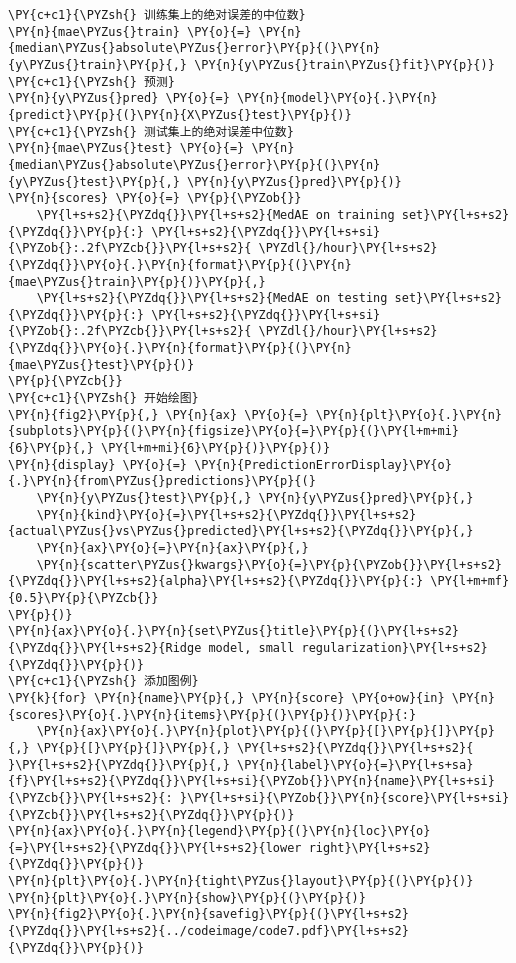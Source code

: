 \begin{Verbatim}[commandchars=\\\{\}]
\PY{c+c1}{\PYZsh{} 训练集上的绝对误差的中位数}
\PY{n}{mae\PYZus{}train} \PY{o}{=} \PY{n}{median\PYZus{}absolute\PYZus{}error}\PY{p}{(}\PY{n}{y\PYZus{}train}\PY{p}{,} \PY{n}{y\PYZus{}train\PYZus{}fit}\PY{p}{)}
\PY{c+c1}{\PYZsh{} 预测}
\PY{n}{y\PYZus{}pred} \PY{o}{=} \PY{n}{model}\PY{o}{.}\PY{n}{predict}\PY{p}{(}\PY{n}{X\PYZus{}test}\PY{p}{)}
\PY{c+c1}{\PYZsh{} 测试集上的绝对误差中位数}
\PY{n}{mae\PYZus{}test} \PY{o}{=} \PY{n}{median\PYZus{}absolute\PYZus{}error}\PY{p}{(}\PY{n}{y\PYZus{}test}\PY{p}{,} \PY{n}{y\PYZus{}pred}\PY{p}{)}
\PY{n}{scores} \PY{o}{=} \PY{p}{\PYZob{}}
    \PY{l+s+s2}{\PYZdq{}}\PY{l+s+s2}{MedAE on training set}\PY{l+s+s2}{\PYZdq{}}\PY{p}{:} \PY{l+s+s2}{\PYZdq{}}\PY{l+s+si}{\PYZob{}:.2f\PYZcb{}}\PY{l+s+s2}{ \PYZdl{}/hour}\PY{l+s+s2}{\PYZdq{}}\PY{o}{.}\PY{n}{format}\PY{p}{(}\PY{n}{mae\PYZus{}train}\PY{p}{)}\PY{p}{,}
    \PY{l+s+s2}{\PYZdq{}}\PY{l+s+s2}{MedAE on testing set}\PY{l+s+s2}{\PYZdq{}}\PY{p}{:} \PY{l+s+s2}{\PYZdq{}}\PY{l+s+si}{\PYZob{}:.2f\PYZcb{}}\PY{l+s+s2}{ \PYZdl{}/hour}\PY{l+s+s2}{\PYZdq{}}\PY{o}{.}\PY{n}{format}\PY{p}{(}\PY{n}{mae\PYZus{}test}\PY{p}{)}
\PY{p}{\PYZcb{}}
\PY{c+c1}{\PYZsh{} 开始绘图}
\PY{n}{fig2}\PY{p}{,} \PY{n}{ax} \PY{o}{=} \PY{n}{plt}\PY{o}{.}\PY{n}{subplots}\PY{p}{(}\PY{n}{figsize}\PY{o}{=}\PY{p}{(}\PY{l+m+mi}{6}\PY{p}{,} \PY{l+m+mi}{6}\PY{p}{)}\PY{p}{)}
\PY{n}{display} \PY{o}{=} \PY{n}{PredictionErrorDisplay}\PY{o}{.}\PY{n}{from\PYZus{}predictions}\PY{p}{(}
    \PY{n}{y\PYZus{}test}\PY{p}{,} \PY{n}{y\PYZus{}pred}\PY{p}{,}
    \PY{n}{kind}\PY{o}{=}\PY{l+s+s2}{\PYZdq{}}\PY{l+s+s2}{actual\PYZus{}vs\PYZus{}predicted}\PY{l+s+s2}{\PYZdq{}}\PY{p}{,} 
    \PY{n}{ax}\PY{o}{=}\PY{n}{ax}\PY{p}{,} 
    \PY{n}{scatter\PYZus{}kwargs}\PY{o}{=}\PY{p}{\PYZob{}}\PY{l+s+s2}{\PYZdq{}}\PY{l+s+s2}{alpha}\PY{l+s+s2}{\PYZdq{}}\PY{p}{:} \PY{l+m+mf}{0.5}\PY{p}{\PYZcb{}}
\PY{p}{)}
\PY{n}{ax}\PY{o}{.}\PY{n}{set\PYZus{}title}\PY{p}{(}\PY{l+s+s2}{\PYZdq{}}\PY{l+s+s2}{Ridge model, small regularization}\PY{l+s+s2}{\PYZdq{}}\PY{p}{)}
\PY{c+c1}{\PYZsh{} 添加图例}
\PY{k}{for} \PY{n}{name}\PY{p}{,} \PY{n}{score} \PY{o+ow}{in} \PY{n}{scores}\PY{o}{.}\PY{n}{items}\PY{p}{(}\PY{p}{)}\PY{p}{:}
    \PY{n}{ax}\PY{o}{.}\PY{n}{plot}\PY{p}{(}\PY{p}{[}\PY{p}{]}\PY{p}{,} \PY{p}{[}\PY{p}{]}\PY{p}{,} \PY{l+s+s2}{\PYZdq{}}\PY{l+s+s2}{ }\PY{l+s+s2}{\PYZdq{}}\PY{p}{,} \PY{n}{label}\PY{o}{=}\PY{l+s+sa}{f}\PY{l+s+s2}{\PYZdq{}}\PY{l+s+si}{\PYZob{}}\PY{n}{name}\PY{l+s+si}{\PYZcb{}}\PY{l+s+s2}{: }\PY{l+s+si}{\PYZob{}}\PY{n}{score}\PY{l+s+si}{\PYZcb{}}\PY{l+s+s2}{\PYZdq{}}\PY{p}{)}
\PY{n}{ax}\PY{o}{.}\PY{n}{legend}\PY{p}{(}\PY{n}{loc}\PY{o}{=}\PY{l+s+s2}{\PYZdq{}}\PY{l+s+s2}{lower right}\PY{l+s+s2}{\PYZdq{}}\PY{p}{)}
\PY{n}{plt}\PY{o}{.}\PY{n}{tight\PYZus{}layout}\PY{p}{(}\PY{p}{)}
\PY{n}{plt}\PY{o}{.}\PY{n}{show}\PY{p}{(}\PY{p}{)}
\PY{n}{fig2}\PY{o}{.}\PY{n}{savefig}\PY{p}{(}\PY{l+s+s2}{\PYZdq{}}\PY{l+s+s2}{../codeimage/code7.pdf}\PY{l+s+s2}{\PYZdq{}}\PY{p}{)}
\end{Verbatim}

